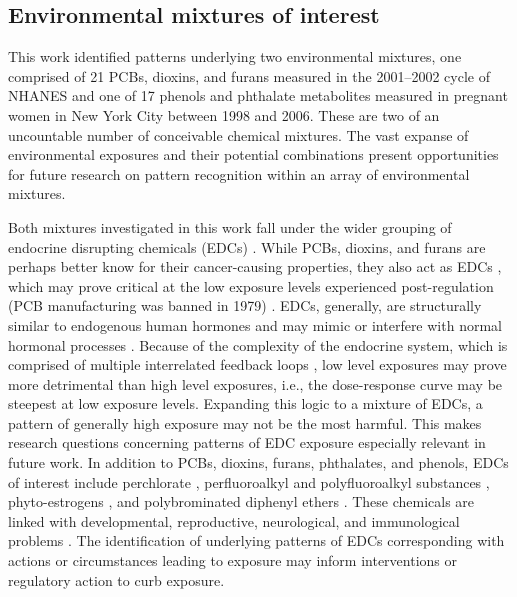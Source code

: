 \subsection{Environmental mixtures of interest}
This work identified patterns underlying two environmental mixtures, one comprised of 21 PCBs, dioxins, and furans measured in the 2001--2002 cycle of NHANES and one of 17 phenols and phthalate metabolites measured in pregnant women in New York City between 1998 and 2006. These are two of an uncountable number of conceivable chemical mixtures. The vast expanse of environmental exposures and their potential combinations present opportunities for future research on pattern recognition within an array of environmental mixtures. 

Both mixtures investigated in this work fall under the wider grouping of endocrine disrupting chemicals (EDCs) \citep{gore2015edc}. While PCBs, dioxins, and furans are perhaps better know for their cancer-causing properties, they also act as EDCs \citep{van1998toxic}, which may prove critical at the low exposure levels experienced post-regulation (PCB manufacturing was banned in 1979) \citep{trost1989regulation}. EDCs, generally, are structurally similar to endogenous human hormones and may mimic or interfere with normal hormonal processes \citep{kavlock1996research, zoeller2012endocrine}. Because of the complexity of the endocrine system, which is comprised of multiple interrelated feedback loops \citep{diamanti2009endocrine}, low level exposures may prove more detrimental than high level exposures, i.e., the dose-response curve may be steepest at low exposure levels. Expanding this logic to a mixture of EDCs, a pattern of generally high exposure may not be the most harmful. This makes research questions concerning patterns of EDC exposure especially relevant in future work. In addition to PCBs, dioxins, furans, phthalates, and phenols, EDCs of interest include perchlorate \citep{nizinski2020perchlorate}, perfluoroalkyl and polyfluoroalkyl substances \citep{pfaswebsite}, phyto-estrogens \citep{yilmaz2020endocrine}, and polybrominated diphenyl ethers \citep{gibson2018effects}. These chemicals are linked with developmental, reproductive, neurological, and immunological problems \citep{solomon2000environment, meeker2012exposure, kabir2015review}. The identification of underlying patterns of EDCs corresponding with actions or circumstances leading to exposure may inform interventions or regulatory action to curb exposure.

